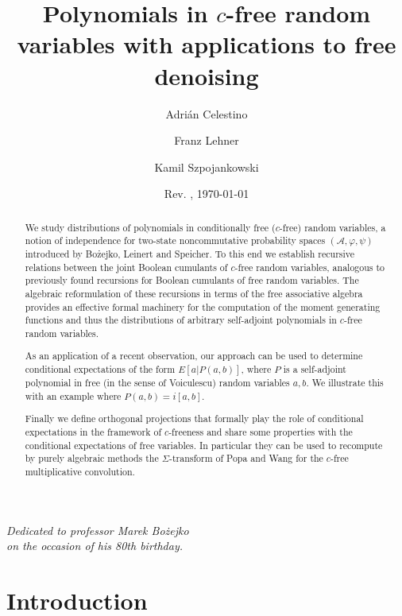 \documentclass[12pt]{amsart}
\title[Polynomials in c-free random variables]{Polynomials in $c$-free random variables with applications to free denoising}
\author[A. Celestino]{Adrián Celestino}
\author[F. Lehner]{Franz Lehner}
\author[K. Szpojankowski]{Kamil Szpojankowski}
\def\E{E}
\theoremstyle{definition}
\numberwithin{equation}{section}
\begin{document}
\date{Rev. \SVNRevision, \today}

\begin{abstract}
  We study distributions of polynomials in conditionally free ($c$-free) random
  variables, a notion of independence
  for
  two-state noncommutative probability spaces $(\mathcal{A},\varphi,\psi)$ introduced by
  Bo\.zejko, Leinert and Speicher.
  To this end we establish recursive relations between the
  joint Boolean cumulants of $c$-free random variables,
  analogous to previously found recursions for Boolean cumulants of free random variables.
  The algebraic reformulation of these recursions in terms of the free associative
  algebra provides an effective formal machinery for the computation
  of the moment  generating functions and thus  the   distributions
  of arbitrary self-adjoint polynomials in $c$-free random variables.  
   
  As an application of a recent observation, our approach can be used to determine conditional expectations
  of the form $\E[a|P(a,b)]$, where $P$ is a self-adjoint polynomial
  in free (in the sense of Voiculescu) random variables $a,b$.
  We illustrate this with an example where $P(a,b)=i[a,b]$.  
  
  Finally we define orthogonal projections
  that formally play the role of conditional expectations in the framework of
  $c$-freeness and share some properties with the conditional expectations of
  free variables. In particular they can be used to recompute
  by purely  algebraic methods the $\Sigma$-transform of Popa and Wang for  
  the $c$-free multiplicative convolution.
\end{abstract}


\maketitle

\begin{flushright}
	\itshape
	Dedicated to professor Marek Bo\.zejko\\ on the occasion of his 80th birthday.
\end{flushright}
\tableofcontents{}

\section{Introduction}
\end{document}

